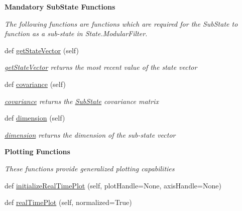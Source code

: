 \begin{Indent}{\bf Mandatory Sub\+State Functions}\par
{\em The following functions are functions which are required for the Sub\+State to function as a sub-\/state in State.\+Modular\+Filter. }\begin{DoxyCompactItemize}
\item 
def \hyperlink{classmodest_1_1substates_1_1substate_1_1SubState_aa18c8238415131b4b63cef0e4b2ff9fd}{get\+State\+Vector} (self)
\begin{DoxyCompactList}\small\item\em \hyperlink{classmodest_1_1substates_1_1substate_1_1SubState_aa18c8238415131b4b63cef0e4b2ff9fd}{get\+State\+Vector} returns the most recent value of the state vector \end{DoxyCompactList}\item 
def \hyperlink{classmodest_1_1substates_1_1substate_1_1SubState_a6e308aadd13962e476d2892ec728e3a5}{covariance} (self)
\begin{DoxyCompactList}\small\item\em \hyperlink{classmodest_1_1substates_1_1substate_1_1SubState_a6e308aadd13962e476d2892ec728e3a5}{covariance} returns the \hyperlink{classmodest_1_1substates_1_1substate_1_1SubState}{Sub\+State} covariance matrix \end{DoxyCompactList}\item 
def \hyperlink{classmodest_1_1substates_1_1substate_1_1SubState_ab9027f6d1d7d57c47731612f519b7ee6}{dimension} (self)
\begin{DoxyCompactList}\small\item\em \hyperlink{classmodest_1_1substates_1_1substate_1_1SubState_ab9027f6d1d7d57c47731612f519b7ee6}{dimension} returns the dimension of the sub-\/state vector \end{DoxyCompactList}\end{DoxyCompactItemize}
\end{Indent}
\begin{Indent}{\bf Plotting Functions}\par
{\em These functions provide generalized plotting capabilities }\begin{DoxyCompactItemize}
\item 
def \hyperlink{classmodest_1_1substates_1_1substate_1_1SubState_a1adac64be88eab0a64bb952518c4268f}{initialize\+Real\+Time\+Plot} (self, plot\+Handle=None, axis\+Handle=None)
\item 
def \hyperlink{classmodest_1_1substates_1_1substate_1_1SubState_a2deb7d1ca3105eb20e50fa7e67298355}{real\+Time\+Plot} (self, normalized=True)
\end{DoxyCompactItemize}
\end{Indent}
